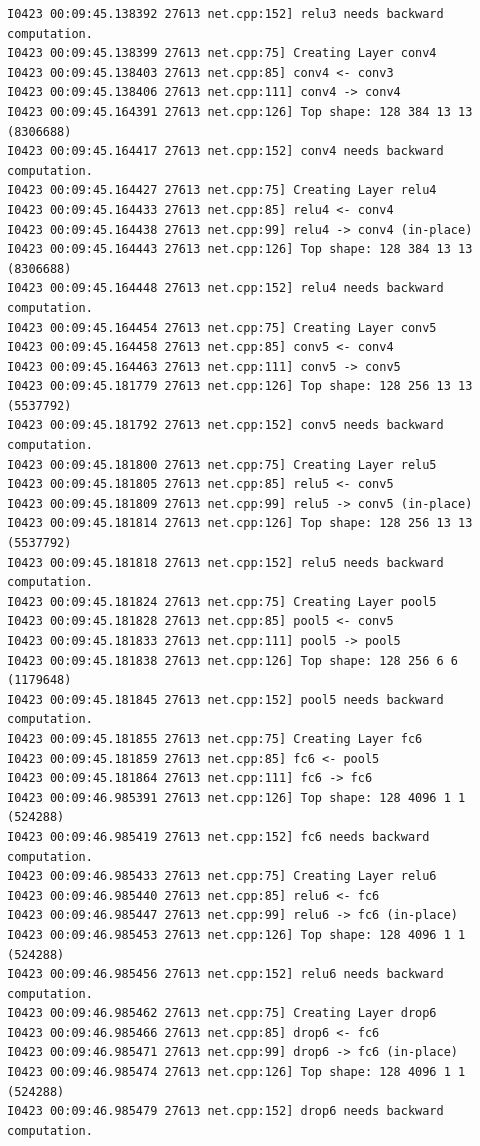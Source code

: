 \documentclass[a4]{article}
\begin{document}
\begin{lstlisting}
I0423 00:09:45.138392 27613 net.cpp:152] relu3 needs backward computation.
I0423 00:09:45.138399 27613 net.cpp:75] Creating Layer conv4
I0423 00:09:45.138403 27613 net.cpp:85] conv4 <- conv3
I0423 00:09:45.138406 27613 net.cpp:111] conv4 -> conv4
I0423 00:09:45.164391 27613 net.cpp:126] Top shape: 128 384 13 13 (8306688)
I0423 00:09:45.164417 27613 net.cpp:152] conv4 needs backward computation.
I0423 00:09:45.164427 27613 net.cpp:75] Creating Layer relu4
I0423 00:09:45.164433 27613 net.cpp:85] relu4 <- conv4
I0423 00:09:45.164438 27613 net.cpp:99] relu4 -> conv4 (in-place)
I0423 00:09:45.164443 27613 net.cpp:126] Top shape: 128 384 13 13 (8306688)
I0423 00:09:45.164448 27613 net.cpp:152] relu4 needs backward computation.
I0423 00:09:45.164454 27613 net.cpp:75] Creating Layer conv5
I0423 00:09:45.164458 27613 net.cpp:85] conv5 <- conv4
I0423 00:09:45.164463 27613 net.cpp:111] conv5 -> conv5
I0423 00:09:45.181779 27613 net.cpp:126] Top shape: 128 256 13 13 (5537792)
I0423 00:09:45.181792 27613 net.cpp:152] conv5 needs backward computation.
I0423 00:09:45.181800 27613 net.cpp:75] Creating Layer relu5
I0423 00:09:45.181805 27613 net.cpp:85] relu5 <- conv5
I0423 00:09:45.181809 27613 net.cpp:99] relu5 -> conv5 (in-place)
I0423 00:09:45.181814 27613 net.cpp:126] Top shape: 128 256 13 13 (5537792)
I0423 00:09:45.181818 27613 net.cpp:152] relu5 needs backward computation.
I0423 00:09:45.181824 27613 net.cpp:75] Creating Layer pool5
I0423 00:09:45.181828 27613 net.cpp:85] pool5 <- conv5
I0423 00:09:45.181833 27613 net.cpp:111] pool5 -> pool5
I0423 00:09:45.181838 27613 net.cpp:126] Top shape: 128 256 6 6 (1179648)
I0423 00:09:45.181845 27613 net.cpp:152] pool5 needs backward computation.
I0423 00:09:45.181855 27613 net.cpp:75] Creating Layer fc6
I0423 00:09:45.181859 27613 net.cpp:85] fc6 <- pool5
I0423 00:09:45.181864 27613 net.cpp:111] fc6 -> fc6
I0423 00:09:46.985391 27613 net.cpp:126] Top shape: 128 4096 1 1 (524288)
I0423 00:09:46.985419 27613 net.cpp:152] fc6 needs backward computation.
I0423 00:09:46.985433 27613 net.cpp:75] Creating Layer relu6
I0423 00:09:46.985440 27613 net.cpp:85] relu6 <- fc6
I0423 00:09:46.985447 27613 net.cpp:99] relu6 -> fc6 (in-place)
I0423 00:09:46.985453 27613 net.cpp:126] Top shape: 128 4096 1 1 (524288)
I0423 00:09:46.985456 27613 net.cpp:152] relu6 needs backward computation.
I0423 00:09:46.985462 27613 net.cpp:75] Creating Layer drop6
I0423 00:09:46.985466 27613 net.cpp:85] drop6 <- fc6
I0423 00:09:46.985471 27613 net.cpp:99] drop6 -> fc6 (in-place)
I0423 00:09:46.985474 27613 net.cpp:126] Top shape: 128 4096 1 1 (524288)
I0423 00:09:46.985479 27613 net.cpp:152] drop6 needs backward computation.

\end{lstlisting}
\end{document}

